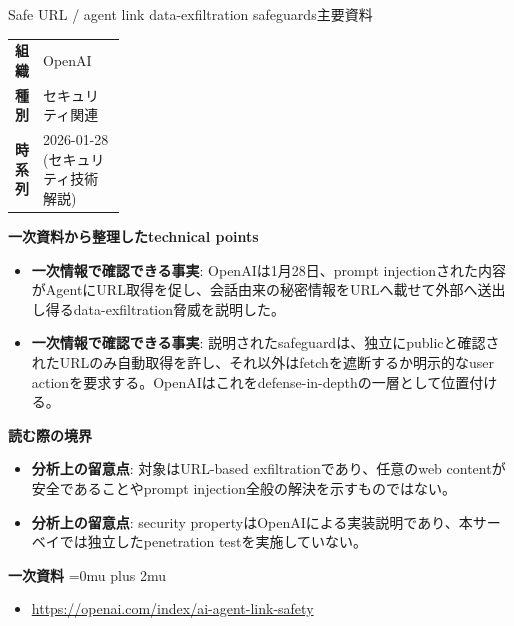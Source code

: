 \begin{technicalnote}{Safe URL / agent link data-exfiltration safeguards}{主要資料}
\begingroup
\begin{tabularx}{\linewidth}{@{}>{\bfseries}p{0.22\linewidth}X@{}}
組織 & OpenAI \\
種別 & セキュリティ関連 \\
時系列 & 2026-01-28 (セキュリティ技術解説) \\
\end{tabularx}
\smallskip
{\bfseries 一次資料から整理したtechnical points}
\begin{itemize}[leftmargin=1.5em,itemsep=0.35em]
\item \textbf{一次情報で確認できる事実}: OpenAIは1月28日、prompt injectionされた内容がAgentにURL取得を促し、会話由来の秘密情報をURLへ載せて外部へ送出し得るdata-exfiltration脅威を説明した。
\item \textbf{一次情報で確認できる事実}: 説明されたsafeguardは、独立にpublicと確認されたURLのみ自動取得を許し、それ以外はfetchを遮断するか明示的なuser actionを要求する。OpenAIはこれをdefense-in-depthの一層として位置付ける。
\end{itemize}
\begin{minipage}{\linewidth}
{\bfseries 読む際の境界}
\begin{itemize}[leftmargin=1.5em,itemsep=0.35em]
\item \textbf{分析上の留意点}: 対象はURL-based exfiltrationであり、任意のweb contentが安全であることやprompt injection全般の解決を示すものではない。
\item \textbf{分析上の留意点}: security propertyはOpenAIによる実装説明であり、本サーベイでは独立したpenetration testを実施していない。
\end{itemize}
\begin{samepage}
{\bfseries 一次資料}
\begingroup\sloppy
\Urlmuskip=0mu plus 2mu\relax
\begin{itemize}[leftmargin=1.5em,itemsep=0.25em]
\item {\scriptsize\url{https://openai.com/index/ai-agent-link-safety}}
\end{itemize}
\endgroup
\end{samepage}
\end{minipage}
\endgroup
\end{technicalnote}
\medskip

